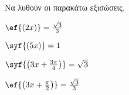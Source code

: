 Να λυθούν οι παρακάτω εξισώσεις.
\begin{alist}[leftmargin=3mm]
\begin{multicols}{2}
\item $ \ef{(2x)}=\frac{\sqrt{3}}{3} $
\item $ \syf{(5x)}=1 $
\item $ \syf{\left( 3x+\frac{3\pi}{4}\right) }=\sqrt{3} $
\item $ \ef{\left(3x+\frac{\pi}{2}\right)}=\frac{\sqrt{3}}{3} $
\end{multicols}
\end{alist}
